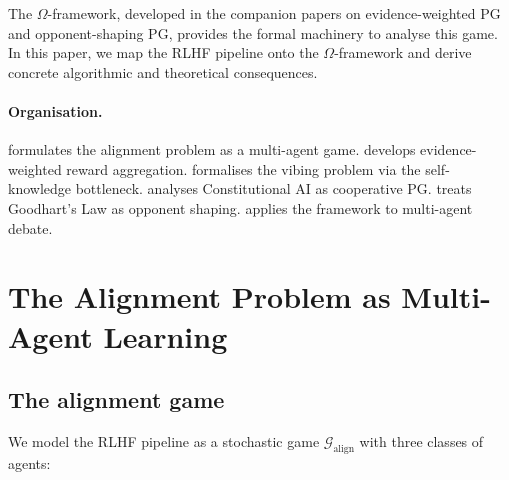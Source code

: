 \documentclass[11pt,a4paper]{article}
\begin{document}
The $\Omega$-framework, developed in the companion papers on evidence-weighted PG and opponent-shaping PG, provides the formal machinery to analyse this game. In this paper, we map the RLHF pipeline onto the $\Omega$-framework and derive concrete algorithmic and theoretical consequences.

\paragraph{Organisation.}  formulates the alignment problem as a multi-agent game.  develops evidence-weighted reward aggregation.  formalises the vibing problem via the self-knowledge bottleneck.  analyses Constitutional AI as cooperative PG.  treats Goodhart's Law as opponent shaping.  applies the framework to multi-agent debate.


\section{The Alignment Problem as Multi-Agent Learning}
\label{sec:alignment-game}

\subsection{The alignment game}

We model the RLHF pipeline as a stochastic game $\mathcal{G}_{\mathrm{align}}$ with three classes of agents:
\end{document}

